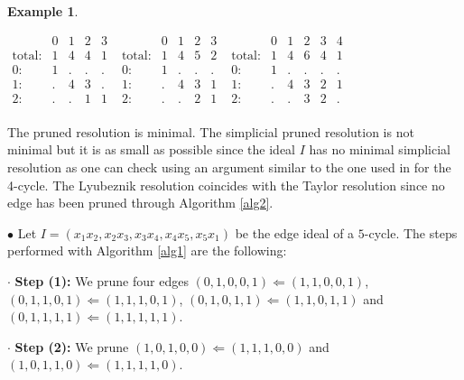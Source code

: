 \documentclass[12pt]{amsart}
\theoremstyle{definition}
\newtheorem{example}[theorem]{Example}
\theoremstyle{remark}
\numberwithin{equation}{section}
\begin{document}
\begin{example}
\begin{center}
{\small $\begin{matrix}
&0&1&2&3\\\text{total:}&1&4&4&1\\\text{0:}&1&\text{.}&\text{.}&\text{.}\\\text{1:}&\text{.}&4&3&\text{.}\\\text{2:}&\text{.}&\text{.}&1&1\\\end{matrix}
$
\hfill
$\begin{matrix}
&0&1&2&3\\
\text{total:}&1&4&5&2\\
\text{0:}&1&\text{.}&\text{.}&\text{.}\\
\text{1:}&\text{.}&4&3&1\\
\text{2:}&\text{.}&\text{.}&2&1\\
\end{matrix}$
\hfill
$\begin{matrix}
&0&1&2&3&4\\
\text{total:}&1&4&6&4&1\\
\text{0:}&1&\text{.}&\text{.}&\text{.}&\text{.}\\
\text{1:}&\text{.}&4&3&2&1\\
\text{2:}&\text{.}&\text{.}&3&2&\text{.}\\
\end{matrix}$
}
\hskip 1cm
\end{center}
%
The pruned resolution is minimal. The simplicial pruned resolution is not minimal but it is as small
as possible since the ideal $I$ has no minimal simplicial resolution as one can check using an argument
similar to the one used in \cite[Section 3.2]{Jac04} for the 4-cycle. The Lyubeznik resolution coincides with the Taylor
resolution since no edge has been pruned through Algorithm \ref{alg2}.

\vskip 2mm

$\bullet$  Let $I=({x}_{1} {x}_{2}, {x}_{2} {x}_{3}, {x}_{3} {x}_{4}, {x}_{4} {x}_{5}, {x}_{5} {x}_{1})$
be the edge ideal of a $5$-cycle. The steps performed with Algorithm \ref{alg1} are the following:


\vskip 2mm

\noindent $\cdot$ {\bf Step (1):} We prune four edges $(0,1,0,0,1) \Leftarrow (1,1,0,0,1)$,
$(0,1,1,0,1) \Leftarrow (1,1,1,0,1)$, $(0,1,0,1,1) \Leftarrow (1,1,0,1,1)$ and $(0,1,1,1,1) \Leftarrow (1,1,1,1,1)$.


\noindent $\cdot$ {\bf Step (2):} We prune  $(1,0,1,0,0) \Leftarrow (1,1,1,0,0)$ and $(1,0,1,1,0) \Leftarrow (1,1,1,1,0)$.




\end{example}
\end{document}
